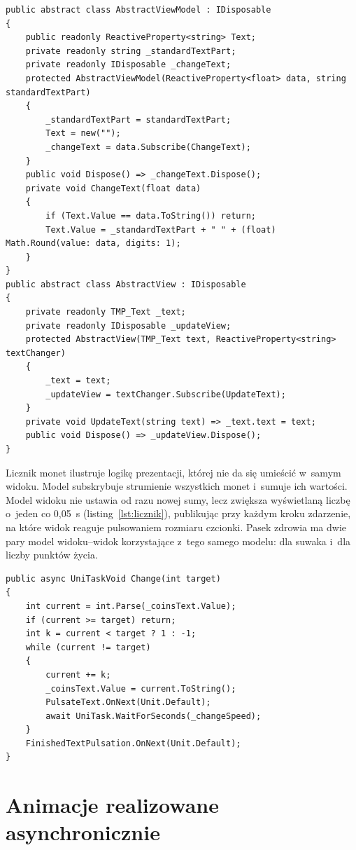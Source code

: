 \begin{lstlisting}[caption={Generyczny model widoku i~widok panelu informacyjnego; \zrodloWlasne},label=lst:mvvm]
public abstract class AbstractViewModel : IDisposable
{
    public readonly ReactiveProperty<string> Text;
    private readonly string _standardTextPart;
    private readonly IDisposable _changeText;
    protected AbstractViewModel(ReactiveProperty<float> data, string standardTextPart)
    {
        _standardTextPart = standardTextPart;
        Text = new("");
        _changeText = data.Subscribe(ChangeText);
    }
    public void Dispose() => _changeText.Dispose();
    private void ChangeText(float data)
    {
        if (Text.Value == data.ToString()) return;
        Text.Value = _standardTextPart + " " + (float) Math.Round(value: data, digits: 1);
    }
}
public abstract class AbstractView : IDisposable
{
    private readonly TMP_Text _text;
    private readonly IDisposable _updateView;
    protected AbstractView(TMP_Text text, ReactiveProperty<string> textChanger)
    {
        _text = text;
        _updateView = textChanger.Subscribe(UpdateText);
    }
    private void UpdateText(string text) => _text.text = text;
    public void Dispose() => _updateView.Dispose();
}
\end{lstlisting}

Licznik monet ilustruje logikę prezentacji, której nie da się umieścić w~samym widoku.
Model subskrybuje strumienie wszystkich monet i~sumuje ich wartości. Model widoku nie
ustawia od razu nowej sumy, lecz zwiększa wyświetlaną liczbę o~jeden co 0,05~s
(listing~\ref{lst:licznik}), publikując przy każdym kroku zdarzenie, na które widok
reaguje pulsowaniem rozmiaru czcionki. Pasek zdrowia ma dwie pary model widoku--widok
korzystające z~tego samego modelu: dla suwaka i~dla liczby punktów życia.

\begin{lstlisting}[caption={Stopniowa zmiana licznika monet w~modelu widoku; \zrodloWlasne},label=lst:licznik]
public async UniTaskVoid Change(int target)
{
    int current = int.Parse(_coinsText.Value);
    if (current >= target) return;
    int k = current < target ? 1 : -1;
    while (current != target)
    {
        current += k;
        _coinsText.Value = current.ToString();
        PulsateText.OnNext(Unit.Default);
        await UniTask.WaitForSeconds(_changeSpeed);
    }
    FinishedTextPulsation.OnNext(Unit.Default);
}
\end{lstlisting}

\section{Animacje realizowane asynchronicznie}

